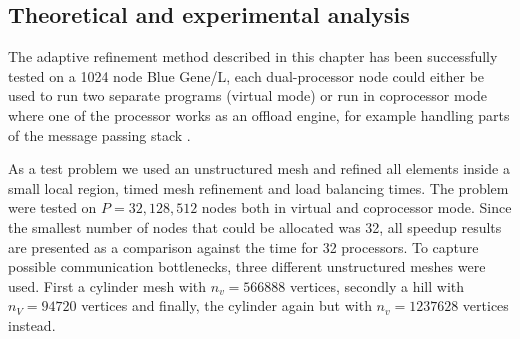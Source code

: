 
\subsection{Theoretical and experimental analysis}

The adaptive refinement method described in this chapter has been
successfully tested on a 1024 node Blue Gene/L, each dual-processor
node could either be used to run two separate programs (virtual mode)
or run in coprocessor mode where one of the processor works as an
offload engine, for example handling parts of the message passing
stack \cite{GarBlu2005a, MorAlm2005a}.

As a test problem we used an unstructured mesh and refined all
elements inside a small local region, timed mesh refinement and load
balancing times. The problem were tested on $P = {32,128,512}$ nodes
both in virtual and coprocessor mode. Since the smallest number of
nodes that could be allocated was 32, all speedup results are
presented as a comparison against the time for 32 processors. To
capture possible communication bottlenecks, three different
unstructured meshes were used. First a cylinder mesh with $n_v =
566888$ vertices, secondly a hill with $n_V = 94720$ vertices and
finally, the cylinder again but with $n_v = 1237628$ vertices instead.
